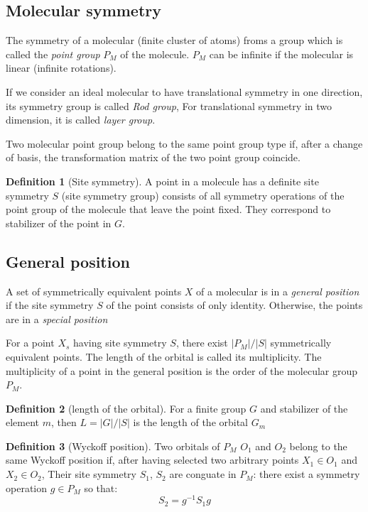 \documentclass{amsart}
\theoremstyle{remark}
\theoremstyle{remark}
\theoremstyle{definition}
\newtheorem*{definition}{Definition}
\begin{document}
\subsection*{Molecular symmetry}
The symmetry of a molecular (finite cluster of atoms) froms a group which is called the \emph{point group} $P_M$ of the molecule. $P_M$
can be infinite if the molecular is linear (infinite rotations). 

If we consider an ideal molecular to have translational symmetry in one direction, its symmetry group is called \emph{Rod group}, 
For translational symmetry in two dimension, it is called \emph{layer group}.

Two molecular point group belong to the same point group type if, after a change of basis, the transformation matrix of the two point group
coincide. 

\vspace{10pt}

\begin{definition}
    [Site symmetry]
    A point in a molecule has a definite site symmetry $S$ (site symmetry group) consists of all symmetry operations of the point group
    of the molecule that leave the point fixed. They correspond to stabilizer of the point in $G$.
\end{definition}

\subsection*{General position}
A set of symmetrically equivalent points $X$ of a molecular is in a \emph{general position} if the site symmetry $S$ of the point
consists of only identity. 
Otherwise, the points are in a \emph{special position}

For a point $X_s$ having site symmetry $S$, there exist $|P_M|/|S|$ symmetrically equivalent points. 
The length of the orbital is called its multiplicity.
The multiplicity of a point in the general position is the order of the molecular group $P_M$.

\begin{definition}
    [length of the orbital]
    For a finite group $G$ and stabilizer of the element $m$, then $L = |G|/|S|$ is the length of the orbital $G_m$
\end{definition}

\begin{definition}
    [Wyckoff position]
    Two orbitals of $P_M$ $O_1$ and $O_2$ belong to the same Wyckoff position if, after having selected two arbitrary points $X_1 \in O_1$ 
    and $X_2 \in O_2$, Their site symmetry $S_1$, $S_2$ are conguate in $P_M$: there exist a symmetry operation $g \in P_M$ so that:
    \[S_2 = g^{-1}S_1 g\]
\end{definition}
\end{document}
